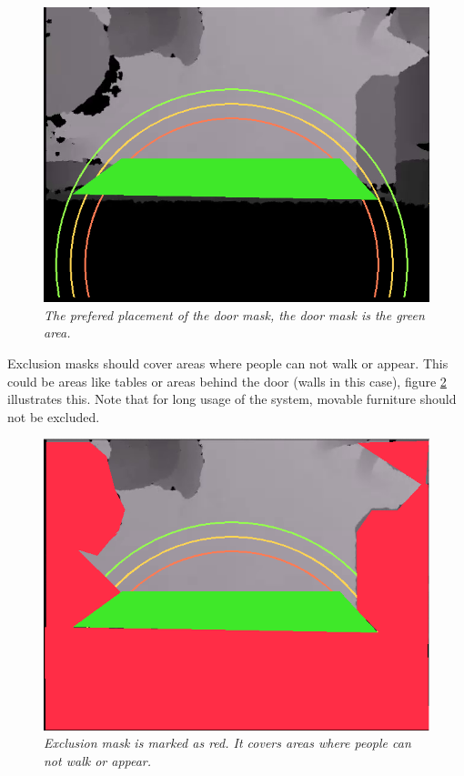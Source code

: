 \begin{figure}[H]
	\centering
	\includegraphics[width=\linewidth]{images/Manual3.png}
	\caption[Exclusion mask]{\textit{The prefered placement of the door mask, the door mask is the green area.}}
	\label{fig:doorMask}  %
\end{figure}

\newpage
Exclusion masks should cover areas where people can not walk or appear. This could be areas like tables or areas behind the door (walls in this case), figure \ref{fig:exMask} illustrates this. Note that for long usage of the system, movable furniture should not be excluded.

\begin{figure}[H]
	\centering
	\includegraphics[width=\linewidth]{images/Manual1.png}
	\caption[Exclusion mask]{\textit{Exclusion mask is marked as red. It covers areas where people can not walk or appear.}}
	\label{fig:exMask}  %
\end{figure}



